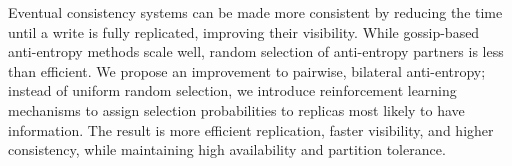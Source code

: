 Eventual consistency systems can be made more consistent by reducing the time
until a write is fully replicated, improving their visibility.
While gossip-based anti-entropy methods scale well, random selection of
anti-entropy partners is less than efficient.
We propose an improvement to pairwise, bilateral anti-entropy; instead
of uniform random selection, we introduce reinforcement learning mechanisms
to assign selection probabilities to replicas most likely to have
information.
The result is more efficient replication, faster visibility, and higher
consistency, while maintaining high availability and partition tolerance.
